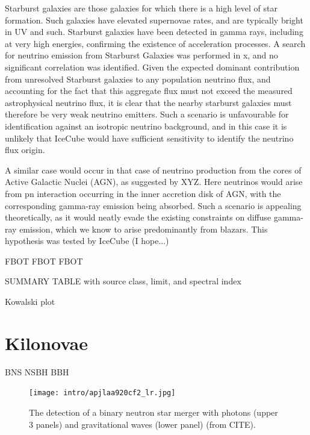 Starburst galaxies are those galaxies for which there is a high level of star formation. Such galaxies have elevated supernovae rates, and are typically bright in UV and such. Starburst galaxies have been detected in gamma rays, including at very high energies, confirming the existence of acceleration processes. A search for neutrino emission from Starburst Galaxies was performed in x, and no significant correlation was identified. Given the expected dominant contribution from unresolved Starburst galaxies to any population neutrino flux, and accounting for the fact that this aggregate flux must not exceed the measured astrophysical neutrino flux, it is clear that the nearby starburst galaxies must therefore be very weak neutrino emitters. Such a scenario is unfavourable for identification against an isotropic neutrino background, and in this case it is unlikely that IceCube would have sufficient sensitivity to identify the neutrino flux origin.

A similar case would occur in that case of neutrino production from the cores of Active Galactic Nuclei (AGN), as suggested by XYZ. Here neutrinos would arise from pn interaction occurring in the inner accretion disk of AGN, with the corresponding gamma-ray emission being absorbed. Such a scenario is appealing theoretically, as it would neatly evade the existing constraints on diffuse gamma-ray emission, which we know to arise predominantly from blazars. This hypothesis was tested by IceCube (I hope...)

FBOT FBOT FBOT

SUMMARY TABLE with source class, limit, and spectral index

Kowalski plot

\section{Kilonovae}
BNS 
NSBH
BBH

\begin{figure}[!ht]
	\centering \texttt{[image: intro/apjlaa920cf2\_lr.jpg]}
	\caption{The detection of a binary neutron star merger with photons (upper 3 panels) and gravitational waves (lower panel)  (from CITE).}
	\label{fig:gw170817}
\end{figure}